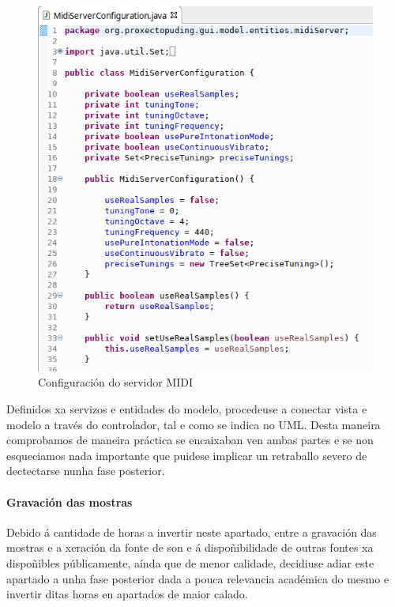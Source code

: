    \begin{figure}[htbp]
    \centering
    \includegraphics[scale=0.6, keepaspectratio=true]{./imagenes/midi-server-configuration.png}
    \caption{Configuración do servidor MIDI}
    \label{figura:MidiServerConfiguration}
   \end{figure}
   
   Definidos xa servizos e entidades do modelo, procedeuse a conectar vista e
   modelo a través do controlador, tal e como se indica no UML. Desta maneira
   comprobamos de maneira práctica se encaixaban ven ambas partes e se non
   esqueciamos nada importante que puidese implicar un retraballo severo de
   dectectarse nunha fase posterior.

   \paragraph{Gravación das mostras}
   
   Debido á cantidade de horas a invertir neste apartado, entre a gravación das
   mostras e a xeración da fonte de son e á dispoñibilidade de outras fontes xa
   dispoñibles públicamente, aínda que de menor calidade, decidiuse adiar este
   apartado a unha fase posterior dada a pouca relevancia académica do mesmo e
   invertir ditas horas en apartados de maior calado.

